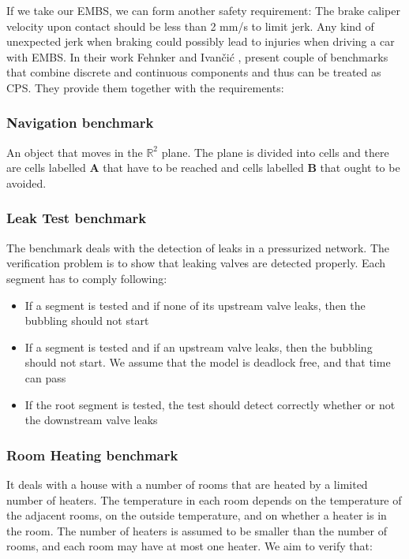 If we take our EMBS, we can form another safety requirement: The brake caliper velocity upon contact should be less than 2 mm/s to limit jerk. Any kind of unexpected jerk when braking could possibly lead to injuries when driving a car with EMBS. In their work Fehnker and Ivančić \cite{Fehnker:BenchmarksHybridSystems}, present couple of benchmarks that combine discrete and continuous components and thus can be treated as CPS. They provide them together with the requirements:

\subsubsection{Navigation benchmark}

An object that moves in the ${\mathbb{R}}^2$ plane. The plane is divided into cells and there are cells labelled \textbf{A} that have to be reached and cells labelled \textbf{B} that ought to be avoided.

\subsubsection{Leak Test benchmark}

The benchmark deals with the detection of leaks in a pressurized network. The verification problem is to show that leaking valves are detected properly. Each segment has to comply following:

\begin{itemize}
	\item If a segment is tested and if none of its upstream valve leaks, then the bubbling should not start
	\item If a segment is tested and if an upstream valve leaks, then the bubbling should not start. We assume that the model is deadlock free, and that time can pass
	\item If the root segment is tested, the test should detect correctly whether or not the downstream valve leaks
\end{itemize}

\subsubsection{Room Heating benchmark}

It deals with a house with a number of rooms that are heated by a limited number of heaters. The temperature in each room depends on the temperature of the adjacent rooms, on the outside temperature, and on whether a heater is in the room. The number of heaters is assumed to be smaller than the number of rooms, and each room may have at most one heater. We aim to verify that:

